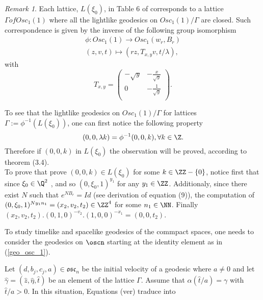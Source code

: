 \documentclass[11pt]{amsart}
\theoremstyle{plain}
\theoremstyle{definition}
\theoremstyle{remark}
\newtheorem{rem}{Remark}
\begin{document}
        \begin{rem}
            Each lattice, $L(\xi_0)$, in Table 6 of \cite{MF} corresponds to a lattice $\Gamma of Osc_1(1)$ where all the lightlike geodesics on $Osc_1(1)/\Gamma$ are closed. Such correspondence is given by the inverse of the following group isomorphism \cite{MF}
              \begin{eqnarray}
                  \phi: Osc_1(1) \rightarrow Osc_1(w_r, B_r) \\
                  (z,v,t) \mapsto (r z, T_{x,y} v, t/\lambda),
              \end{eqnarray}
              with $$T_{x,y} = \left( \begin{matrix}
				-\sqrt{y} & -\frac{x}{\sqrt{y}} \\
				0 & -\frac{1}{\sqrt{y}} \\
			\end{matrix} \right).$$

   To see that the lightlike geodesics on $Osc_1(1)/\Gamma$ for lattices $\Gamma := \phi^{-1}(L(\xi_0))$, one can first notice the following property $$(0,0,\lambda k) = \phi^{-1}(0,0,k), \forall k \in \Z. $$ Therefore if $(0,0,k)$ in $L(\xi_0)$ the observation will be proved, according to theorem (3.4).\\

   To prove that prove $(0,0,k) \in L(\xi_0)$ for some $k \in \ZZ - \{ 0 \}$, notice first that since $\xi_0 \in \Q^2$ \cite{MF}, and so $(0,\xi_0,1)^{y_1}$ for any $y_1 \in \ZZ$. Additionaly, since there exist $N$ such that $e^{N B_r} = Id$ (see derivation of equation (9)), the computation of $(0,\xi_0,1)^{N y_1 n_1} = (x_2,v_2,t_2) \in \ZZ^4$ for some $n_1 \in \NN$. Finally $(x_2, v_2, t_2) . (0,1,0)^{-v_2} . (1, 0, 0)^{-x_1} = (0,0,t_2)$.
        \end{rem}
		
		To  study  timelike and spacelike geodesics of the commpact spaces, one needs to  consider the geodesics on $\oscn$ starting at the identity element as in (\ref{geo_osc_1}).
		
		 Let  $(d,b_j,c_j,a)\in \mathfrak{osc}_n$ be the initial velocity of a geodesic where $a\neq0$ and let $\hat{\gamma}=(\hat{z}, \hat{\eta}, \hat{t})$ be an element of the lattice $\Gamma$. Assume that $\alpha(\hat{t}/a)=\gamma$ with $\hat{t}/a > 0$. In this situation, Equations (ver) traduce into
		
\end{document}
